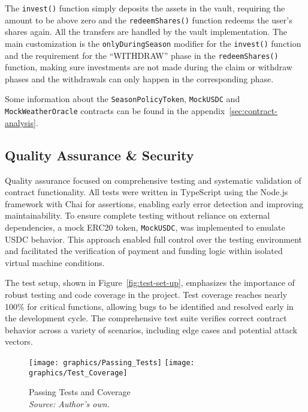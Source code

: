 \documentclass[11pt,a4paper]{article}
\begin{document}
		The \texttt{invest()} function simply deposits the assets in the vault, requiring the amount to be above zero and the \texttt{redeemShares()} function redeems the user's shares again.
		All the transfers are handled by the vault implementation.
		The main customization is the \texttt{onlyDuringSeason} modifier for the \texttt{invest()} function and the requirement for the \enquote{WITHDRAW} phase in the \texttt{redeemShares()} function, making sure investments are not made during the claim or withdraw phases and the withdrawals can only happen in the corresponding phase.

		Some information about the \texttt{SeasonPolicyToken}, \texttt{MockUSDC} and \texttt{MockWeatherOracle} contracts can be found in the appendix~\ref{sec:contract-analysis}.

		\subsection{Quality Assurance \& Security}\label{subsec:qa-security}
		Quality assurance focused on comprehensive testing and systematic validation of contract functionality.
		All tests were written in TypeScript using the Node.js framework with Chai for assertions, enabling early error detection and improving maintainability.
		To ensure complete testing without reliance on external dependencies, a mock ERC20 token, \texttt{MockUSDC}, was implemented to emulate USDC behavior.
		This approach enabled full control over the testing environment and facilitated the verification of payment and funding logic within isolated virtual machine conditions.

		The test setup, shown in Figure~\ref{fig:test-set-up}, emphasizes the importance of robust testing and code coverage in the project.
		Test coverage reaches nearly 100\% for critical functions, allowing bugs to be identified and resolved early in the development cycle.
		The comprehensive test suite verifies correct contract behavior across a variety of scenarios, including edge cases and potential attack vectors.

        \begin{figure}[!htbp]
            \centering
            \begin{minipage}[b]{0.48\textwidth}
                \centering
                \texttt{[image: graphics/Passing\_Tests]}
                \texttt{[image: graphics/Test\_Coverage]}
                \caption{Passing Tests and Coverage \\ \textit{Source: Author's own.}}
                \label{fig:test-set-up}
            \end{minipage}\label{fig:figure}
        \end{figure}
\end{document}
